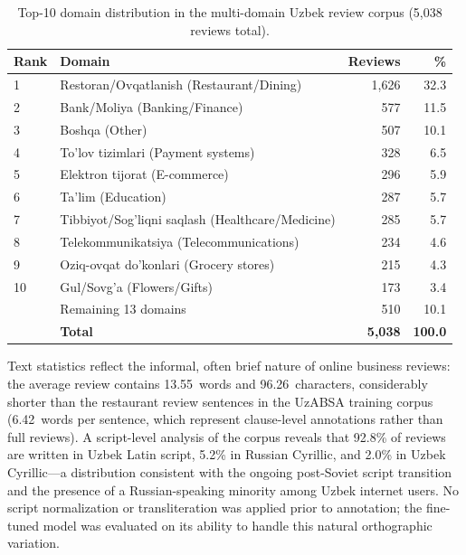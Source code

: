 \documentclass[computers,article,submit,pdftex,moreauthors]{Definitions/mdpi}
\begin{document}
\begin{table}[t]
\centering
\caption{Top-10 domain distribution in the multi-domain Uzbek review corpus (5{,}038 reviews total).}
\label{tab:domain_dist}
\begin{tabular}{llrr}
\toprule
\textbf{Rank} & \textbf{Domain} & \textbf{Reviews} & \textbf{\%} \\
\midrule
1  & Restoran/Ovqatlanish (Restaurant/Dining)              & 1{,}626 & 32.3 \\
2  & Bank/Moliya (Banking/Finance)                         &   577   & 11.5 \\
3  & Boshqa (Other)                                        &   507   & 10.1 \\
4  & To'lov tizimlari (Payment systems)                    &   328   &  6.5 \\
5  & Elektron tijorat (E-commerce)                         &   296   &  5.9 \\
6  & Ta'lim (Education)                                    &   287   &  5.7 \\
7  & Tibbiyot/Sog'liqni saqlash (Healthcare/Medicine)      &   285   &  5.7 \\
8  & Telekommunikatsiya (Telecommunications)               &   234   &  4.6 \\
9  & Oziq-ovqat do'konlari (Grocery stores)                &   215   &  4.3 \\
10 & Gul/Sovg'a (Flowers/Gifts)                            &   173   &  3.4 \\
\midrule
   & Remaining 13 domains                                  &   510   & 10.1 \\
   & \textbf{Total}                                        & \textbf{5{,}038} & \textbf{100.0} \\
\bottomrule
\end{tabular}
\end{table}
Text statistics reflect the informal, often brief nature of online business reviews: the average review contains 13.55~words and 96.26~characters, considerably shorter than the restaurant review sentences in the UzABSA training corpus (6.42~words per sentence, which represent clause-level annotations rather than full reviews). A script-level analysis of the corpus reveals that 92.8\% of reviews are written in Uzbek Latin script, 5.2\% in Russian Cyrillic, and 2.0\% in Uzbek Cyrillic---a distribution consistent with the ongoing post-Soviet script transition and the presence of a Russian-speaking minority among Uzbek internet users. No script normalization or transliteration was applied prior to annotation; the fine-tuned model was evaluated on its ability to handle this natural orthographic variation.
\end{document}
